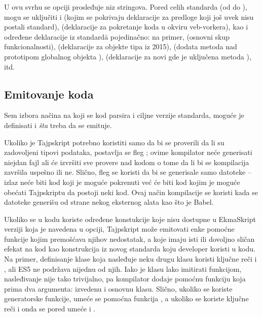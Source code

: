 U ovu svrhu se opciji  prosleđuje niz stringova.
Pored celih standarda (od  do ), mogu se uključiti i  (kojim se pokrivaju deklaracije za predloge koji još uvek nisu postali standard),  (deklaracije za pokretanje koda u okviru veb-vorkera), kao i određene deklaracije iz standard\=a pojedinačno: na primer,  (osnovni skup funkcionalnosti),  (deklaracije za objekte tipa  iz 2015),  (dodata metoda  nad prototipom globalnog objekta ),  (deklaracije za novi  gde je uključena metoda ), itd.

\subsection{Emitovanje koda}

Sem izbora načina na koji se kod parsira i ciljne verzije standarda, moguće je definisati i \textit{šta} treba da se emituje.

Ukoliko je Tajpskript potrebno koristiti samo da bi se proverili da li su zadovoljeni tipovi podataka, postavlja se fleg ; ovime kompilator neće generisati niejdan fajl ali će izvršiti sve provere nad kodom o tome da li bi se kompilacija završila uspešno ili ne.
Slično, fleg  se koristi da bi se generisale samo  datoteke -- izlaz neće biti kod koji je moguće pokrenuti već će biti kod kojim je moguće obećati Tajpskriptu da postoji neki kod.
Ovaj način kompilacije se koristi kada se  datoteke generišu od strane nekog eksternog alata kao što je Babel.

Ukoliko se u kodu koriste određene konstukcije koje nisu dostupne u EkmaSkript verziji koja je navedena u  opciji, Tajpskript može emitovati enke pomoćne funkcije kojim premošćava njihov nedostatak, a koje imaju isti ili dovoljno sličan efekat na kod kao konstrukcija iz novog standarda koju developer koristi u kodu.
Na primer, definisanje klase koja nasleđuje neku drugu klasu koristi ključne reči  i , ali ES5 ne podržava nijednu od njih.
Iako je klasu lako imitirati funkcijom, nasleđivanje nije tako trivijalno, pa kompilator dodaje pomoćnu funkciju  koja prima dva argumenta: izvedenu i osnovnu klasu.
Slično, ukoliko se koriste generatorske funkcije, umeće se pomoćna funkcija , a ukoliko se koriste ključne reči  i  onda se pored  umeće i .

